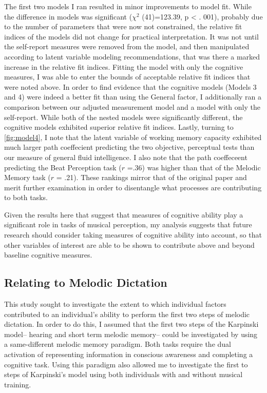 \documentclass[12pt,]{book}
\begin{document}
The first two models I ran resulted in minor improvements to model fit.
While the difference in models was significant (\(\chi^2\) (41)=123.39, p \textless{} . 001), probably due to the number of parameters that were now not constrained, the relative fit indices of the models did not change for practical interpretation.
It was not until the self-report measures were removed from the model, and then manipulated according to latent variable modeling recommendations, that was there a marked increase in the relative fit indices.
Fitting the model with only the cognitive measures, I was able to enter the bounds of acceptable relative fit indices that were noted above.
In order to find evidence that the cognitive models (Models 3 and 4) were indeed a better fit than using the General factor, I additionally ran a comparison between our adjusted measurement model and a model with only the self-report.
While both of the nested models were significantly different, the cognitive models exhibited superior relative fit indices.
Lastly, turning to \ref{fig:model4}, I note that the latent variable of working memory capacity exhibited much larger path coeffecient predicting the two objective, perceptual tests than our measure of general fluid intelligence.
I also note that the path coeffeceent predicting the Beat Perception task (\(r\) =.36) was higher than that of the Melodic Memory task (\(r\) = .21).
These rankings mirror that of the original \citep{mullensiefenMusicalityNonMusiciansIndex2014} paper and merit further examination in order to disentangle what processes are contributing to both tasks.

Given the results here that suggest that measures of cognitive ability play a significant role in tasks of musical perception, my analysis suggests that future research should consider taking measures of cognitive ability into account, so that other variables of interest are able to be shown to contribute above and beyond baseline cognitive measures.

\hypertarget{relating-to-melodic-dictation}{%
\subsection{Relating to Melodic Dictation}\label{relating-to-melodic-dictation}}

This study sought to investigate the extent to which individual factors contributed to an individual's ability to perform the first two steps of melodic dictation.
In order to do this, I assumed that the first two steps of the Karpinski model-- hearing and short term melodic memory-- could be investigated by using a same-different melodic memory paradigm.
Both tasks require the dual activation of representing information in conscious awareness and completing a cognitive task.
Using this paradigm also allowed me to investigate the first to steps of Karpinski's model using both individuals with and without musical training.
\end{document}
